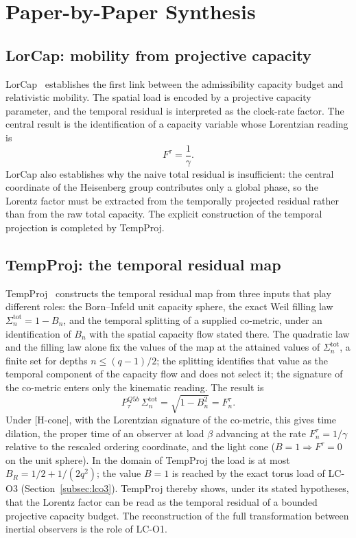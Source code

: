 \documentclass[12pt,a4paper]{article}
\theoremstyle{remark}
\begin{document}
  \section{Paper-by-Paper Synthesis}
  \label{sec:papers}

  \subsection{LorCap: mobility from projective capacity~\texorpdfstring{\cite{Beau2026n}}{}}
    \label{subsec:lorcap}

    LorCap~\cite{Beau2026n} establishes the first link between the admissibility capacity budget
    and relativistic mobility.
    The spatial load is encoded by a projective capacity parameter, and the temporal residual is
    interpreted as the clock-rate factor.
    The central result is the identification of a capacity variable whose Lorentzian reading is
    \[
      F^\tau = \frac{1}{\gamma}.
    \]
    LorCap also establishes why the naive total residual is insufficient: the central coordinate
    of the Heisenberg group contributes only a global phase, so the Lorentz factor must be
    extracted from the temporally projected residual rather than from the raw total capacity.
    The explicit construction of the temporal projection is completed by TempProj.

  \subsection{TempProj: the temporal residual map~\texorpdfstring{\cite{Beau2026tp}}{}}
    \label{subsec:temproj}

    TempProj~\cite{Beau2026tp} constructs the temporal residual map from three inputs that play different
    roles: the Born--Infeld unit capacity sphere, the exact Weil filling law $\Sigma^{\mathrm{tot}}_n = 1-B_n$, and
    the temporal splitting of a supplied co-metric, under an identification of $B_n$ with the spatial capacity
    flow stated there.
    The quadratic law and the filling law alone fix the values of the map at the attained values of
    $\Sigma^{\mathrm{tot}}_n$, a finite set for depths $n \le (q-1)/2$; the splitting identifies that value as the
    temporal component of the capacity flow and does not select it; the signature of the co-metric enters only
    the kinematic reading.
    The result is
    \[
      P^{Q5b}_\tau\,\Sigma^{\mathrm{tot}}_n = \sqrt{1-B_n^2} = F^\tau_n.
    \]
    Under [H-cone], with the Lorentzian signature of the co-metric, this gives time dilation, the proper time of
    an observer at load $\beta$ advancing at the rate $F^\tau_n = 1/\gamma$ relative to the rescaled ordering
    coordinate, and the light cone ($B = 1 \Rightarrow F^\tau = 0$ on the unit sphere).
    In the domain of TempProj the load is at most $B_R = 1/2 + 1/(2q^2)$; the value $B = 1$ is reached by the
    exact torus load of LC-O3 (Section~\ref{subsec:lco3}).
    TempProj thereby shows, under its stated hypotheses, that the Lorentz factor can be read as the temporal
    residual of a bounded projective capacity budget.
    The reconstruction of the full transformation between inertial observers is the role of
    LC-O1.
\end{document}
